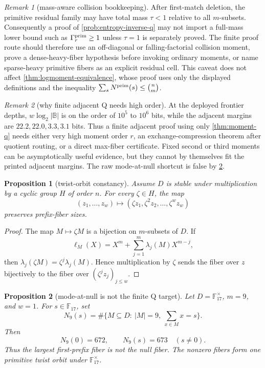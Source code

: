 \documentclass[a4paper,11pt]{amsart}
\newtheorem{proposition}[proposition]{Proposition}
\theoremstyle{remark}
\newtheorem{remark}[remark]{Remark}
\newcommand{\F}{\mathbb F}
\newcommand{\B}{\mathbb B}
\begin{document}
\begin{remark}[mass-aware collision bookkeeping]\label{rem:mass-aware-logmoment}
After first-match deletion, the primitive residual family may have total mass \(\tau<1\) relative to all \(m\)-subsets.  Consequently a proof of \cref{prob:entropy-inverse-q} may not import a full-mass lower bound such as \(\Gamma_r^{\rm prim}\ge1\) unless \(\tau=1\) is separately proved.  The finite proof route should therefore use an off-diagonal or falling-factorial collision moment, prove a dense-heavy-fiber hypothesis before invoking ordinary moments, or name sparse-heavy primitive fibers as an explicit residual cell.  This caveat does not affect \cref{thm:logmoment-equivalence}, whose proof uses only the displayed definitions and the inequality \(\sum_sN^{\rm prim}(s)\le\binom nm\).
\end{remark}

\begin{remark}[why finite adjacent Q needs high order]\label{rem:finite-moment-order}
At the deployed frontier depths, \(w\log_2|\B|\) is on the order of \(10^5\) to \(10^6\) bits, while the adjacent margins are \(22.2,22.0,3.3,3.1\) bits.  Thus a finite adjacent proof using only \cref{thm:moment-q} needs either very high moment order \(r\), an exchange-compression theorem after quotient routing, or a direct max-fiber certificate.  Fixed second or third moments can be asymptotically useful evidence, but they cannot by themselves fit the printed adjacent margins.  The raw mode-at-null shortcut is false by \cref{prop:mode-null-false}.
\end{remark}

\begin{proposition}[twist-orbit constancy]\label{prop:twist-orbit}
Assume \(D\) is stable under multiplication by a cyclic group \(H\) of order \(n\).  For every \(\zeta\in H\), the map
\[
        (z_1,\ldots,z_w)\longmapsto(\zeta z_1,\zeta^2z_2,\ldots,\zeta^wz_w)
\]
preserves prefix-fiber sizes.
\end{proposition}

\begin{proof}
The map \(M\mapsto \zeta M\) is a bijection on \(m\)-subsets of \(D\).  If
\[
        \ell_M(X)=X^m+\sum_{j=1}^m \lambda_j(M)X^{m-j},
\]
then \(\lambda_j(\zeta M)=\zeta^j\lambda_j(M)\).  Hence multiplication by \(\zeta\) sends the fiber over \(z\) bijectively to the fiber over \((\zeta^j z_j)_{j\le w}\).
\end{proof}

\begin{proposition}[mode-at-null is not the finite Q target]\label{prop:mode-null-false}
Let \(D=\F_{17}^{\times}\), \(m=9\), and \(w=1\).  For \(s\in\F_{17}\), set
\[
        N_9(s)=\#\{M\subseteq D:\ |M|=9,\ \sum_{x\in M}x=s\}.
\]
Then
\[
        N_9(0)=672,
        \qquad
        N_9(s)=673\quad(s\ne0).
\]
Thus the largest first-prefix fiber is not the null fiber.  The nonzero fibers form one primitive twist orbit under \(\F_{17}^{\times}\).
\end{proposition}
\end{document}
